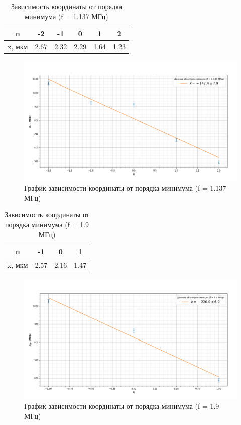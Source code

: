 \documentclass[a4paper, 12pt]{article}%
\begin{document}
	\begin{table}[H]
		\centering
		\begin{tabular}{|c|c|c|c|c|c|}
			\hline
			n      & -2   & -1   & 0    & 1    & 2    \\ \hline
			x, мкм & 2.67 & 2.32 & 2.29 & 1.64 & 1.23 \\ \hline
		\end{tabular}
		\caption{Зависимость координаты от порядка минимума (f = 1.137 МГц)}
	\end{table}
	\begin{figure}[H]
		\centering
		\includegraphics[width=0.8\linewidth]{graph_2}
		\caption{График зависимости координаты от порядка минимума (f = 1.137 МГц)}
		\label{fig:graph2}
	\end{figure}
	\begin{table}[H]
		\centering
		\begin{tabular}{|c|c|c|c|}
			\hline
			n      & -1   & 0    & 1    \\ \hline
			x, мкм & 2.57 & 2.16 & 1.47 \\ \hline
		\end{tabular}
		\caption{Зависимость координаты от порядка минимума (f = 1.9 МГц)}
	\end{table}
	\begin{figure}[H]
		\centering
		\includegraphics[width=0.8\linewidth]{graph_3}
		\caption{График зависимости координаты от порядка минимума (f = 1.9 МГц)}
		\label{fig:graph3}
	\end{figure}
\end{document}
